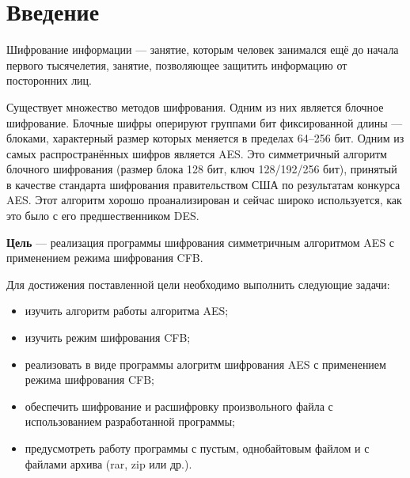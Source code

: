 \chapter*{Введение}

Шифрование информации --- занятие, которым человек занимался ещё до начала первого тысячелетия, занятие, позволяющее защитить информацию от посторонних лиц. 

Существует множество методов шифрования. Одним из них является блочное шифрование. Блочные шифры оперируют группами бит фиксированной длины --- блоками, характерный размер которых меняется в пределах 64--256 бит. Одним из самых распространённых шифров является AES. Это симметричный алгоритм блочного шифрования (размер блока 128 бит, ключ 128/192/256 бит), принятый в качестве стандарта шифрования правительством США по результатам конкурса AES. Этот алгоритм хорошо проанализирован и сейчас широко используется, как это было с его предшественником DES.

\textbf{Цель} --- реализация программы шифрования симметричным алгоритмом AES с применением режима шифрования CFB.

Для достижения поставленной цели необходимо выполнить следующие задачи:
\begin{itemize}[label=---]
	\item изучить алгоритм работы алгоритма AES;
	\item изучить режим шифрования CFB;
	\item реализовать в виде программы алогритм шифрования AES с применением режима шифрования CFB;
	\item обеспечить шифрование и расшифровку произвольного файла с использованием разработанной программы;
	\item предусмотреть работу программы с пустым, однобайтовым файлом и с файлами архива (rar, zip или др.).
\end{itemize}

